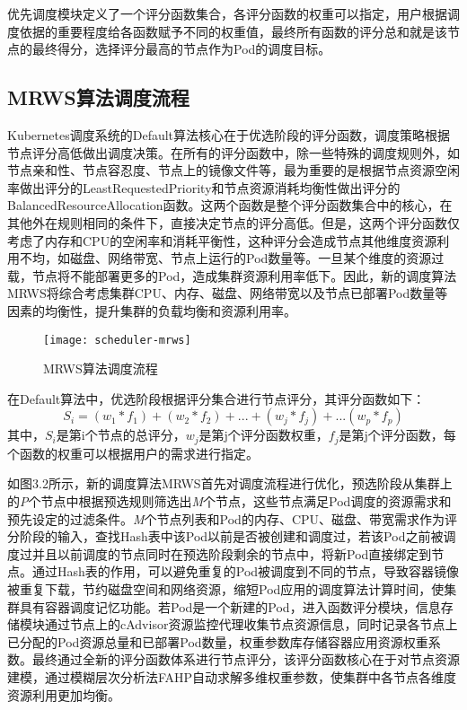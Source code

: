 优先调度模块定义了一个评分函数集合，各评分函数的权重可以指定，用户根据调度依据的重要程度给各函数赋予不同的权重值，最终所有函数的评分总和就是该节点的最终得分，选择评分最高的节点作为Pod的调度目标。

\subsection{MRWS算法调度流程}
Kubernetes调度系统的Default算法核心在于优选阶段的评分函数，调度策略根据节点评分高低做出调度决策。在所有的评分函数中，除一些特殊的调度规则外，如节点亲和性、节点容忍度、节点上的镜像文件等，最为重要的是根据节点资源空闲率做出评分的LeastRequestedPriority和节点资源消耗均衡性做出评分的BalancedResourceAllocation函数。这两个函数是整个评分函数集合中的核心，在其他外在规则相同的条件下，直接决定节点的评分高低。但是，这两个评分函数仅考虑了内存和CPU的空闲率和消耗平衡性，这种评分会造成节点其他维度资源利用不均，如磁盘、网络带宽、节点上运行的Pod数量等。一旦某个维度的资源过载，节点将不能部署更多的Pod，造成集群资源利用率低下。因此，新的调度算法MRWS将综合考虑集群CPU、内存、磁盘、网络带宽以及节点已部署Pod数量等因素的均衡性，提升集群的负载均衡和资源利用率。
\begin{figure}[H] %
	\centering
	\texttt{[image: scheduler-mrws]}
	\caption{MRWS算法调度流程}
\end{figure}
在Default算法中，优选阶段根据评分集合进行节点评分，其评分函数如下：
\begin{equation}
	S_{i} = (w_{1}*f_{1})+(w_{2}*f_{2})+...+(w_{j}*f_{j})+...(w_{p}*f_{p})
\end{equation}
其中，\begin{math}S_{i}\end{math}是第i个节点的总评分，\begin{math}w_{j}\end{math}是第j个评分函数权重，\begin{math}f_{j}\end{math}是第j个评分函数，每个函数的权重可以根据用户的需求进行指定。

如图3.2所示，新的调度算法MRWS首先对调度流程进行优化，预选阶段从集群上的\emph{P}个节点中根据预选规则筛选出\emph{M}个节点，这些节点满足Pod调度的资源需求和预先设定的过滤条件。\emph{M}个节点列表和Pod的内存、CPU、磁盘、带宽需求作为评分阶段的输入，查找Hash表中该Pod以前是否被创建和调度过，若该Pod之前被调度过并且以前调度的节点同时在预选阶段剩余的节点中，将新Pod直接绑定到节点。通过Hash表的作用，可以避免重复的Pod被调度到不同的节点，导致容器镜像被重复下载，节约磁盘空间和网络资源，缩短Pod应用的调度算法计算时间，使集群具有容器调度记忆功能。若Pod是一个新建的Pod，进入函数评分模块，信息存储模块通过节点上的cAdvisor资源监控代理收集节点资源信息，同时记录各节点上已分配的Pod资源总量和已部署Pod数量，权重参数库存储容器应用资源权重系数。最终通过全新的评分函数体系进行节点评分，该评分函数核心在于对节点资源建模，通过模糊层次分析法FAHP自动求解多维权重参数，使集群中各节点各维度资源利用更加均衡。

